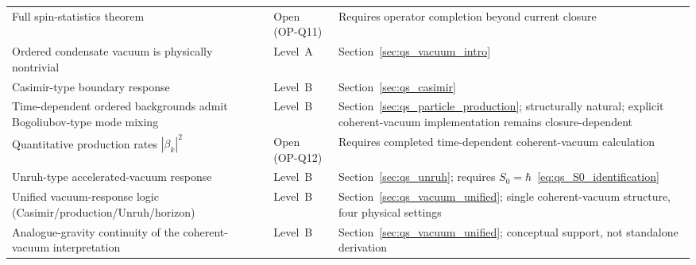 \begin{table}[h]
\begin{tabular}{p{6.0cm}p{2.4cm}p{4.5cm}}
Full spin-statistics theorem
  & Open (OP-Q11)
  & Requires operator completion beyond current closure \\
Ordered condensate vacuum is physically nontrivial
  & Level~A
  & Section~\ref{sec:qs_vacuum_intro} \\
Casimir-type boundary response
  & Level~B
  & Section~\ref{sec:qs_casimir} \\
Time-dependent ordered backgrounds admit Bogoliubov-type mode mixing
  & Level~B
  & Section~\ref{sec:qs_particle_production};
    structurally natural; explicit coherent-vacuum implementation
    remains closure-dependent \\
Quantitative production rates $|\beta_k|^2$
  & Open (OP-Q12)
  & Requires completed time-dependent coherent-vacuum calculation \\
Unruh-type accelerated-vacuum response
  & Level~B
  & Section~\ref{sec:qs_unruh}; requires $S_0=\hbar$~\eqref{eq:qs_S0_identification} \\
Unified vacuum-response logic (Casimir/production/Unruh/horizon)
  & Level~B
  & Section~\ref{sec:qs_vacuum_unified};
    single coherent-vacuum structure, four physical settings \\
Analogue-gravity continuity of the coherent-vacuum interpretation
  & Level~B
  & Section~\ref{sec:qs_vacuum_unified};
    conceptual support, not standalone derivation \\
\hline\hline
\end{tabular}
\end{table}

